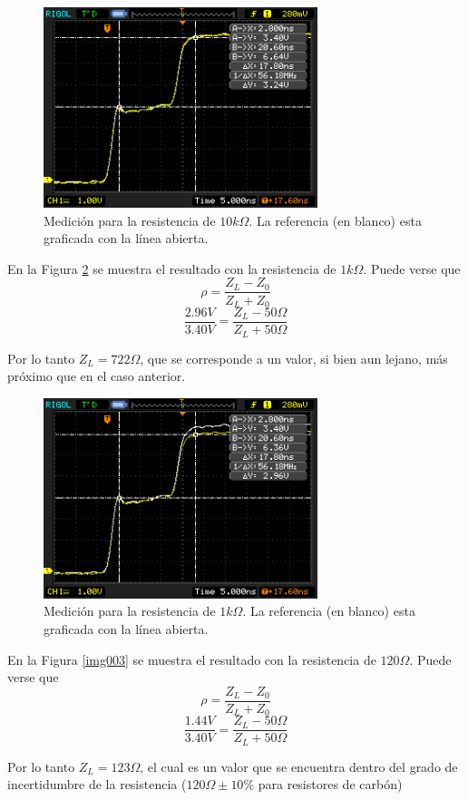\documentclass[a4paper,10pt]{article}
\begin{document}
		\begin{figure}[!htb]
			\centering
			\includegraphics[width=8cm]
			{Imagenes/Res10k.png}
			\caption{Medici\'on para la resistencia de $10k\Omega$. La referencia (en blanco) esta graficada con la l\'inea abierta.}
			\label{img001} 
		\end{figure}

	\indent En la Figura \ref{img002} se muestra el resultado con la 
	resistencia de $1k\Omega$. Puede verse que 
	$$\rho=\frac{Z_L-Z_0}{Z_L+Z_0}$$
	$$\frac{2.96V}{3.40V}=\frac{Z_L- 50\Omega}{Z_L+50\Omega}$$
	
	\indent Por lo tanto $Z_L=722\Omega$, que se corresponde a un valor, si 
	bien aun lejano, m\'as pr\'oximo que en el caso anterior.
		
		\begin{figure}[!htb]
			\centering
			\includegraphics[width=8cm]
			{Imagenes/Res1k.png}
			\caption{Medici\'on para la resistencia de $1k\Omega$. La 
			referencia (en blanco) esta graficada con la l\'inea abierta.}
			\label{img002} 
		\end{figure}

	\indent En la Figura \ref{img003} se muestra el resultado con la 
	resistencia de $120\Omega$. Puede verse que 
	$$\rho=\frac{Z_L-Z_0}{Z_L+Z_0}$$
	$$\frac{1.44V}{3.40V}=\frac{Z_L- 50\Omega}{Z_L+50\Omega}$$
	
	\indent Por lo tanto $Z_L=123\Omega$, el cual es un valor que se encuentra
	dentro del grado de incertidumbre de la resistencia ($120\Omega \pm 10\%$
	para resistores de carb\'on)	
\end{document}
